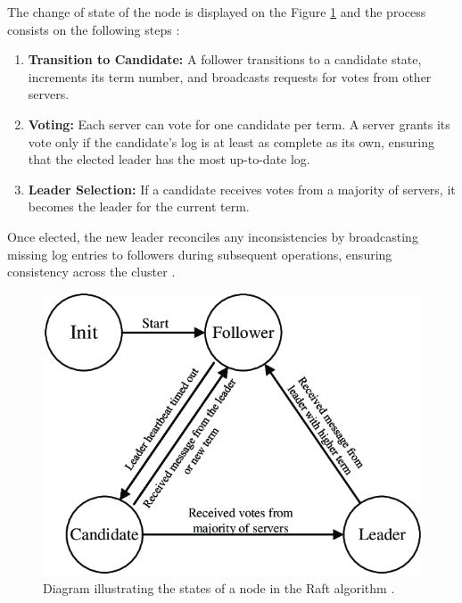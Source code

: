 The change of state of the node is displayed on the Figure \ref{fig:state-raft} and the process consists on the following steps \cite{Vitillo2021,raft-diego}:
\begin{enumerate}
    \item 	\textbf{Transition to Candidate:} A follower transitions to a candidate state, increments its term number, and broadcasts requests for votes from other servers.
    \item 	\textbf{Voting:} Each server can vote for one candidate per term. A server grants its vote only if the candidate’s log is at least as complete as its own, ensuring that the elected leader has the most up-to-date log.
    \item 	\textbf{Leader Selection:} If a candidate receives votes from a majority of servers, it becomes the leader for the current term.
\end{enumerate}

Once elected, the new leader reconciles any inconsistencies by broadcasting missing log entries to followers during subsequent operations, ensuring consistency across the cluster \cite{Tanenbaum2023}.

\begin{figure}
    \centering
    \includegraphics[scale=1]{ch-background/assets/state-raft.png}
    \caption[Diagram illustrating the states of a node in the Raft algorithm]{Diagram illustrating the states of a node in the Raft algorithm \footnotemark.}
    \label{fig:state-raft}
\end{figure}


